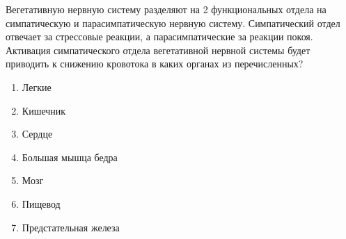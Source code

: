 
Вегетативную нервную систему разделяют на 2 функциональных отдела на 
симпатическую и парасимпатическую нервную систему. 
Симпатический отдел отвечает за стрессовые реакции, 
а парасимпатические за реакции покоя. Активация симпатического 
отдела вегетативной нервной системы будет приводить к снижению кровотока 
в каких органах из перечисленных?

\begin{enumerate}
    \item Легкие
    \item Кишечник
    \item Сердце
    \item Большая мышца бедра
    \item Мозг
    \item Пищевод
    \item Предстательная железа
\end{enumerate}

